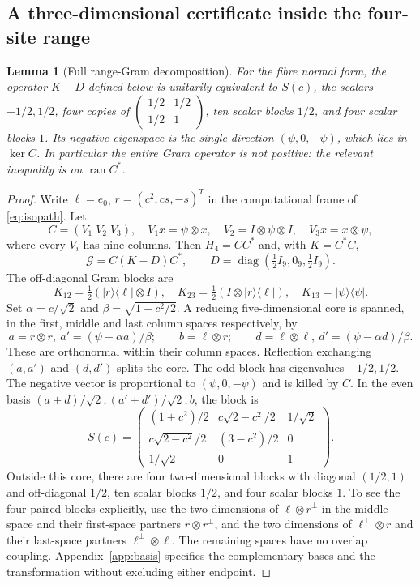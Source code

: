 \documentclass[11pt,a4paper]{article}
\newtheorem{lemma}[theorem]{Lemma}
\theoremstyle{remark}\newtheorem{remark}[theorem]{Remark}
\newcommand{\ket}[1]{\lvert #1\rangle}
\newcommand{\bra}[1]{\langle #1\rvert}
\newcommand{\ran}{\operatorname{ran}}
\newcommand{\diag}{\operatorname{diag}}
\begin{document}
\subsection{A three-dimensional certificate inside the four-site range}
\begin{lemma}[Full range-Gram decomposition]\label{lem:gram}
For the fibre normal form, the operator $K-D$ defined below is unitarily
equivalent to $S(c)$, the scalars $-1/2,1/2$, four copies of
$\left(\begin{smallmatrix}1/2&1/2\\1/2&1\end{smallmatrix}\right)$,
ten scalar blocks $1/2$, and four scalar blocks $1$.
Its negative eigenspace is the single direction $(\psi,0,-\psi)$,
which lies in $\ker C$. In particular the entire Gram operator is not
positive: the relevant inequality is on $\ran C^*$.
\end{lemma}
\begin{proof}
Write $\ell=e_0$, $r=(c^2,cs,-s)^T$ in the computational frame of \eqref{eq:isopath}. Let
\[
 C=(V_1\;V_2\;V_3),\quad
 V_1x=\psi\otimes x,\quad V_2=I\otimes\psi\otimes I,\quad V_3x=x\otimes\psi,
\]
where every $V_i$ has nine columns. Then $H_4=CC^*$ and, with $K=C^*C$,
\[
 \mathcal G=C(K-D)C^*,\qquad D=\diag(\tfrac12 I_9,0_9,\tfrac12 I_9).
\]
The off-diagonal Gram blocks are
\[
 K_{12}=\tfrac12(\ket r\bra\ell\otimes I),\quad
 K_{23}=\tfrac12(I\otimes\ket r\bra\ell),\quad
 K_{13}=\ket\psi\bra\psi.
\]
Set $\alpha=c/\sqrt2$ and $\beta=\sqrt{1-c^2/2}$. A reducing five-dimensional core is spanned, in the first, middle and last column spaces respectively, by
\[
 a=r\otimes r,\ a'=(\psi-\alpha a)/\beta;\qquad
 b=\ell\otimes r;\qquad
 d=\ell\otimes\ell,\ d'=(\psi-\alpha d)/\beta.
\]
These are orthonormal within their column spaces. Reflection exchanging $(a,a')$ and $(d,d')$ splits the core. The odd block has eigenvalues $-1/2,1/2$. The negative vector is proportional to $(\psi,0,-\psi)$ and is killed by $C$. In the even basis $(a+d)/\sqrt2,(a'+d')/\sqrt2,b$, the block is
\begin{equation}\label{eq:Score}
 S(c)=\begin{pmatrix}
 (1+c^2)/2&c\sqrt{2-c^2}/2&1/\sqrt2\\
 c\sqrt{2-c^2}/2&(3-c^2)/2&0\\
 1/\sqrt2&0&1
 \end{pmatrix}.
\end{equation}
Outside this core, there are four two-dimensional blocks with diagonal $(1/2,1)$ and off-diagonal $1/2$, ten scalar blocks $1/2$, and four scalar blocks $1$. To see the four paired blocks explicitly, use the two dimensions of $\ell\otimes r^\perp$ in the middle space and their first-space partners $r\otimes r^\perp$, and the two dimensions of $\ell^\perp\otimes r$ and their last-space partners $\ell^\perp\otimes\ell$. The remaining spaces have no overlap coupling. Appendix~\ref{app:basis} specifies the complementary bases and the transformation without excluding either endpoint.
\end{proof}
\end{document}
